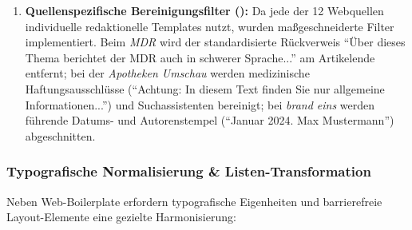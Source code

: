 \begin{enumerate}
\begin{itemize}
        \item \textit{Disclaimer \& Link-Warnungen:} Hinweistexte beim Verlassen geschützter Sprachbereiche (z.\,B. \enquote{Achtung: Dieser Link führt aus unserem Einfache-Sprache-Angebot heraus. Die Informationen sind dann nicht mehr in Leichter Sprache}).
        \item \textit{Credits, Übersetzer- \& Prüfstellennachweise:} Signaturen von Übersetzungsbüros, Prüfgruppen und Illustratorinnen (z.\,B. \enquote{Forschungsstelle Leichte Sprache}, \enquote{Büro für Leichte Sprache}, \enquote{Stefan Albers}, \enquote{European Easy-to-Read Logo}, \enquote{Inclusion Europe}).
        \item \textit{Kicker- \& Dachzeilen-Präfixe:} Führende Rubriken und Ortsmarken am Textanfang (z.\,B. \enquote{Sachsen-Anhalt:}, \enquote{Mitteldeutschland:}, \enquote{in Leichter Sprache Ticker:}, \enquote{Glossar:}).
        \item \textit{Regionale \& Layout-Artefakte:} Technische und bildbezogene Floskeln (z.\,B. \enquote{Icon für die Mobilversion}, \enquote{Von der Straße aus fotografiert}, \enquote{MEHR ANZEIGEN}).
    \end{itemize}
    \item \textbf{Quellenspezifische Bereinigungsfilter ():} Da jede der 12 Webquellen individuelle redaktionelle Templates nutzt, wurden maßgeschneiderte Filter implementiert. Beim \textit{MDR} wird der standardisierte Rückverweis \enquote{Über dieses Thema berichtet der MDR auch in schwerer Sprache...} am Artikelende entfernt; bei der \textit{Apotheken Umschau} werden medizinische Haftungsausschlüsse (\enquote{Achtung: In diesem Text finden Sie nur allgemeine Informationen...}) und Suchassistenten bereinigt; bei \textit{brand eins} werden führende Datums- und Autorenstempel (\enquote{Januar 2024. Max Mustermann}) abgeschnitten.
\end{enumerate}

\subsubsection{Typografische Normalisierung \& Listen-Transformation}
Neben Web-Boilerplate erfordern typografische Eigenheiten und barrierefreie Layout-Elemente eine gezielte Harmonisierung:

